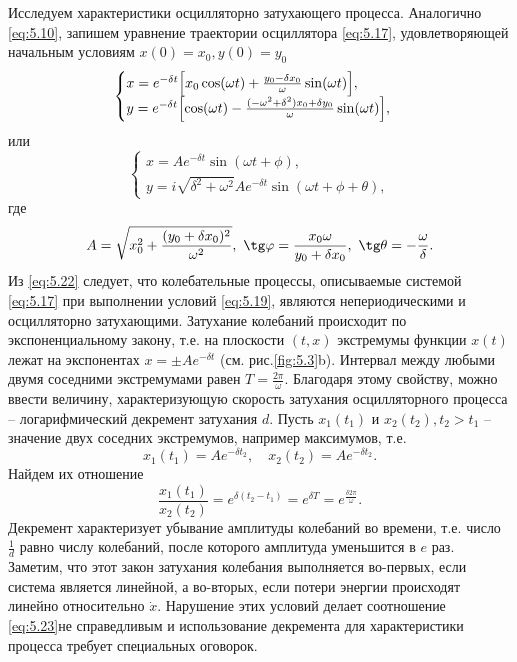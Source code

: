 Исследуем характеристики осцилляторно затухающего процесса. Аналогично \eqref{eq:5.10}, запишем уравнение траектории осциллятора \eqref{eq:5.17}, удовлетворяющей начальным условиям $x(0) = x_0, y(0) = y_0$ 
\begin{equation}
        \label{eq:5.21}
        \begin{cases}
                x=e^{-\delta t} \qty[ x_0 \cos( \omega t) + \frac{y_0- \delta x_0}{\omega} \sin(\omega t) ] ,\\
                y= e^{-\delta t} \qty[\cos(\omega t) - \frac{( -\omega^2 + \delta^2) x_0 + \delta y_0}{\omega} \sin(\omega t)],
        \end{cases}
\end{equation}
или
\begin{equation}
        \label{eq:5.22}
        \begin{cases}
                x = A e^{-\delta t} \sin(\omega t + \phi),\\
                y = i \sqrt{ \delta^2 + \omega^2} A e^{-\delta t} \sin(\omega t + \phi +  \theta),
        \end{cases}
\end{equation}
где 
\begin{equation}
        \label{eq:}
        A = \sqrt{ x_0^2 + \frac{( y_0 + \delta x_0)^2}{\omega^2}}, ~ \tg \phi = \frac{x_0 \omega}{y_0 + \delta x_0}, ~ \tg \theta = - \frac{\omega}{\delta}.
\end{equation}
Из \eqref{eq:5.22} следует, что колебательные процессы, описываемые системой \eqref{eq:5.17} при выполнении условий \eqref{eq:5.19}, являются непериодическими и осцилляторно затухающими. Затухание колебаний происходит по экспоненциальному закону, т.е. на плоскости $(t,x)$ экстремумы функции $x(t)$ лежат на экспонентах $x= \pm A e^{-\delta t}$ (см. рис.\ref{fig:5.3}b). Интервал между любыми двумя соседними экстремумами равен $T = \frac{ 2 \pi}{\omega}$.
Благодаря этому свойству, можно ввести величину, характеризующую скорость затухания осцилляторного процесса -- логарифмический декремент затухания $d$. Пусть $x_1(t_1)$ и $x_2(t_2), t_2>t_1$ -- значение двух соседних экстремумов, например максимумов, т.е.
\begin{equation}
        \label{eq:}
        x_1(t_1) = A e^{- \delta t_2}, \quad x_2(t_2) = A e^{-\delta t_2}.
\end{equation}
Найдем их отношение
\begin{equation}
        \label{eq:5.23}
        \frac{x_1(t_1)}{x_2(t_2)} = e ^{\delta(t_2-t_1)} = e^{\delta T} = e^{\frac{\delta2 \pi}{\omega}}.
\end{equation}
Декремент характеризует убывание амплитуды колебаний во времени, т.е. число $\frac{1}{d}$ равно числу колебаний, после которого амплитуда уменьшится в $e $ раз. Заметим, что этот закон затухания колебания выполняется во-первых, если система является линейной, а во-вторых, если потери энергии происходят линейно относительно $\dot x$. Нарушение этих условий делает соотношение \eqref{eq:5.23}не справедливым и использование декремента для характеристики  процесса требует специальных оговорок.

